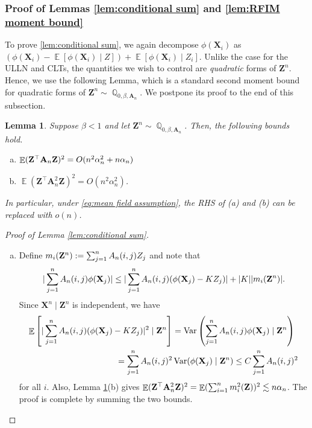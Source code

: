\documentclass[preprint,reqno]{imsart}
\newtheorem{lemma}[thm]{Lemma}
\newcommand{\an}{\alpha_{\mathnormal n}}
\DeclareMathOperator{\EE}{\mathbb{E}}
\DeclareMathOperator{\Var}{Var}
\DeclareMathOperator{\QQ}{\mathbb{Q}}
\newcommand{\A}{\mathbf{A}}
\newcommand{\Z}{\mathbf{Z}}
\newcommand{\X}{\mathbf{X}}
\DeclareMathOperator{\sumin}{\sum_{\mathnormal i=1}^{\mathnormal n}}
\DeclareMathOperator{\sumjn}{\sum_{\mathnormal j=1}^{\mathnormal n}}
\begin{document}
\begin{appendix}
\subsubsection{Proof of Lemmas \ref{lem:conditional sum} and \ref{lem:RFIM moment bound}}\label{subsec:Ising model concentration}


{
To prove \cref{lem:conditional sum}, we again decompose $\phi(\X_i)$ as $\left(\phi(\X_i) - \EE[\phi(\X_i) \mid Z]\right) + \EE[\phi(\X_i) \mid Z_i]$. Unlike the case for the ULLN and CLTs, the quantities we wish to control are \textit{quadratic} forms of $\Z^n$. Hence, we use the following Lemma, which is a standard second moment bound for quadratic forms of $\Z^n \sim \QQ_{0, \beta, \A_n}$. We postpone its proof to the end of this subsection.
}

\begin{lemma}\label{lem:Ising moment concentration}
    Suppose $\beta < 1$ and let $\Z^n \sim \QQ_{0, \beta, \A_n}$. Then, the following bounds hold.
    \begin{enumerate}[(a)]
        \item $\EE (\Z^\top \A_n \Z)^2 = O(n^2 \alpha_n^2 + n\an)$
        \item $\EE (\Z^\top \A_n^2 \Z)^2 %
        = O(n^2 \alpha_n^2)$.
    \end{enumerate}
    In particular, under \eqref{eq:mean field assumption}, the RHS of (a) and (b) can be replaced with $o(n)$. %
\end{lemma}
\begin{proof}[Proof of Lemma \ref{lem:conditional sum}]
    \begin{enumerate}[(a)]
    \item Define $m_i({\Z^n}) := \sumjn A_n(i,j) Z_j$
    and note that
    \begin{equation}
        |\sumjn A_n(i,j) \phi(\X_j)| \le |\sumjn A_n(i,j) (\phi(\X_j) - K Z_j)| + |K| |m_i({\Z^n})|.
    \end{equation}
    Since $\X^n \mid \Z^n$ is independent, we have
    \begin{align*}
        \EE \left[ |\sumjn A_n(i,j) (\phi(\X_j) - K Z_j)|^2 \mid \Z^n \right] & = \Var \left( \sumjn A_n(i,j) \phi(\X_j) \mid \Z^n \right) \\
        = \sumjn A_n(i,j)^2 &\Var( \phi(\X_j) \mid \Z^n ) \le C \sumjn A_n(i,j)^2
    \end{align*}
    for all $i$. Also, Lemma \ref{lem:Ising moment concentration}(b) gives $\EE (\Z^\top \A_n^2 \Z)^2 = \EE (\sumin m_i^2(\Z))^2 \lesssim n\an$.
    The proof is complete by summing the two bounds.
   

\end{enumerate}
\end{proof}
\end{appendix}
\end{document}
